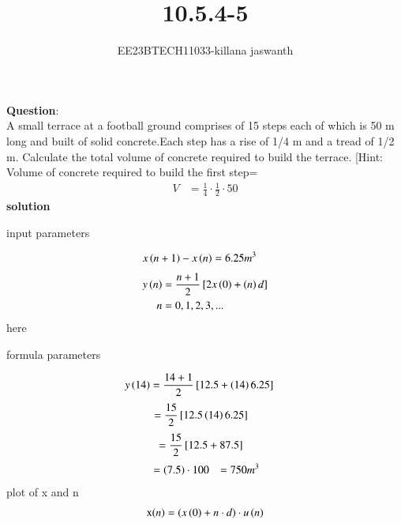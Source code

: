 \documentclass[journal,12pt,twocolumn]{IEEEtran}
\theoremstyle{remark}
\begin{document}

\vspace{3cm}

\title{10.5.4-5}
\author{EE23BTECH11033-killana jaswanth}
\maketitle
\newpage

\bigskip

\renewcommand{\thefigure}{\theenumi}
\renewcommand{\thetable}{\theenumi}
\textbf{Question}:\\
A small terrace at a football ground comprises of 15 steps each of which is 50
m long and built of solid concrete.Each step has a rise of 1/4 m and a tread of
1/2 m. Calculate the total volume of concrete required to build the terrace.
[Hint: Volume of concrete required to build the first step=\begin{align}
    V&=\frac{1}{4} \cdot \frac{1}{2} \cdot 50 
\end{align}
\textbf{solution} 
\begin{table}[!ht]
 \centering
  
   \caption{input parameters}
   \label{tab:10.5.4.5}
   \end{table}
\begin{align}
x\left(n+1\right)-x\left(n\right)&=6.25m^3
\end{align}
\begin{align}
y\left(n\right) &= \frac{n+1}{2} {}\left[2x\left(0\right)+\left(n\right)d\right]   
\\n&=0,1,2,3,...
\end{align}
here\\\begin{table}[!ht]
 \centering
  
   \caption{formula parameters}
   \label{tab:10.5.4.5}
   \end{table}
\begin{align}
y\left(14\right) &= \frac{14+1}{2} {}\left[12.5+\left(14\right)6.25\right]
\end{align}
\begin{align}
 &= \frac{15}{2}{}\left[12.5\left(14\right)6.25\right]
\end{align}
   \begin{align}
    &= \frac{15}{2} {}\left[12.5+87.5\right]
   \end{align}
   \begin{align}
   &=\left(7.5\right) \cdot 100
   &=750m^3
   \end{align}
plot of x and n
\begin{align}
    \text{x\ensuremath{\left(n\right)}}=\left(x\left(0\right)+n \cdot d \right) \cdot u\left(n\right)
\end{align}
\end{document}
